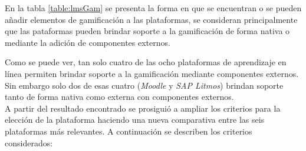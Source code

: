  \noindent En la tabla \ref{table:lmsGam} se presenta la forma en que se encuentran o se
 pueden añadir elementos de gamificación a las plataformas, se consideran principalmente 
 que las pataformas pueden brindar soporte a la gamificación de forma nativa o mediante
 la adición de componentes externos.

 
 \noindent Como se puede ver, tan solo cuatro de las ocho plataformas de aprendizaje
 en línea permiten brindar soporte a la gamificación mediante componentes externos.
 Sin embargo solo dos de esas cuatro ({\it Moodle} y {\it SAP Litmos}) brindan soporte
 tanto de forma nativa como externa con componentes externos.\\
 
 \noindent A partir del resultado encontrado se prosiguió a ampliar los criterios para
 la elección de la plataforma haciendo una nueva comparativa entre las seis plataformas
 más relevantes. A continuación se describen los criterios considerados:
 
